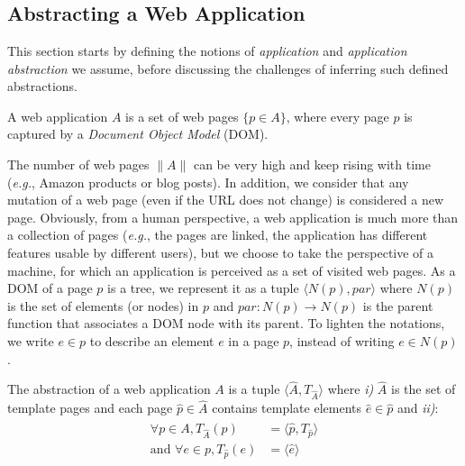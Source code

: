 \section{\appstract{}}\label{appstract:sec:appstract}
\subsection{Abstracting a Web Application}
This section starts by defining the notions of \emph{application} and \emph{application abstraction} we assume, before discussing the challenges of inferring such defined abstractions.

\begin{defn}[\em Application]
A web application $A$ is a set of web pages $\{p \in A\}$, where every page $p$ is captured by a \emph{Document Object Model} (DOM).
\end{defn}

The number of web pages $\|A\|$ can be very high and keep rising with time (\emph{e.g.}, Amazon products or blog posts).
In addition, we consider that any mutation of a web page (even if the URL does not change) is considered a new page.
Obviously, from a human perspective, a web application is much more than a collection of pages (\emph{e.g.}, the pages are linked, the application has different features usable by different users), but we choose to take the perspective of a machine, for which an application is perceived as a set of visited web pages.
% 
As a DOM of a page $p$ is a tree, we represent it as a tuple $\langle N(p), par \rangle$ where $N(p)$ is the set of elements (or nodes) in $p$ and $par: N(p) \to N(p)$ is the parent function that associates a DOM node with its parent.
To lighten the notations, we write $e \in p$ to describe an element $e$ in a page $p$, instead of writing $e \in N(p)$.

\begin{defn}
The abstraction of a web application $A$ is a tuple $\langle\hat{A}, T_{\hat{A}}\rangle$ where \emph{i)} $\hat{A}$ is the set of template pages and each page $\hat{p} \in \hat{A}$ contains template elements $\hat{e} \in \hat{p}$ and \emph{ii)}:
\begin{align}
  \label{eq:1}
  \begin{split}
    \forall p \in A, T_{\hat{A}}(p) & = \langle\hat{p}, T_{\hat{p}}\rangle \\
    \text{and } \forall e \in p, T_{\hat{p}}(e) & = \langle\hat{e}\rangle
  \end{split}
\end{align}\end{defn}

